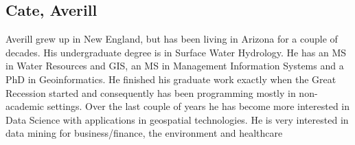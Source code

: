 
\subsection{Cate, Averill}

Averill grew up in New England, but has been living in Arizona for a couple of decades.  His undergraduate degree is in
Surface Water Hydrology.  He has an MS in Water Resources and GIS, an MS in Management Information Systems and a  PhD in
Geoinformatics.  He finished his graduate work exactly when the Great Recession started and consequently has been programming
mostly in non-academic settings.  Over the last couple of years he has become more interested in Data Science with
applications in geospatial technologies.   He is very interested in data mining for business/finance, the environment and
healthcare

